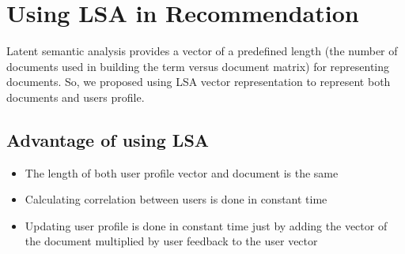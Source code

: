 \section{Using LSA in Recommendation}
Latent semantic analysis provides a vector of a predefined length (the number of documents used in building the term versus document matrix) for representing documents.
So, we proposed using LSA vector representation to represent both documents and users profile.
\subsection{Advantage of using LSA}
\begin{itemize}
\item  The length of both user profile vector and document is the same
\item  Calculating correlation between users is done in constant time
\item  Updating user profile is done in constant time just by adding the vector of the document multiplied by user feedback to the user vector
\end{itemize}









